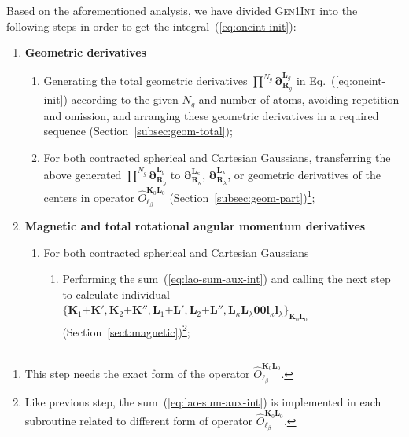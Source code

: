 \documentclass[a4paper,11pt,twoside,openright]{book}
\begin{document}
Based on the aforementioned analysis, we have divided \textsc{Gen1Int} into the following steps
in order to get the integral~(\ref{eq:oneint-init}):
\begin{enumerate}
  \item \textbf{Geometric derivatives}
  \begin{enumerate}
    \item Generating the total geometric derivatives
      $\prod^{N_{g}}\boldsymbol{\partial}_{\boldsymbol{R}_{g}}^{\boldsymbol{L}_{g}}$
      in Eq.~(\ref{eq:oneint-init}) according to the given $N_{g}$ and number of atoms, avoiding
      repetition and omission, and arranging these geometric derivatives in a required sequence (Section~\ref{subsec:geom-total});
    \item For both contracted spherical and Cartesian Gaussians, transferring the above generated
      $\prod^{N_{g}}\boldsymbol{\partial}_{\boldsymbol{R}_{g}}^{\boldsymbol{L}_{g}}$
      to $\boldsymbol{\partial}_{\boldsymbol{R}_{\kappa}}^{\boldsymbol{L}_{\kappa}}$,
      $\boldsymbol{\partial}_{\boldsymbol{R}_{\lambda}}^{\boldsymbol{L}_{\lambda}}$,
      or geometric derivatives of the centers in operator $\hat{O}_{\ell_{\beta}}^{\boldsymbol{K}_{0}\boldsymbol{L}_{0}}$
      (Section~\ref{subsec:geom-part})\footnote{This step needs the exact form of the operator
      $\hat{O}_{\ell_{\beta}}^{\boldsymbol{K}_{0}\boldsymbol{L}_{0}}$.};
  \end{enumerate}
  \item \textbf{Magnetic and total rotational angular momentum derivatives}
  \begin{enumerate}
    \item For both contracted spherical and Cartesian Gaussians
    \begin{enumerate}
      \item Performing the sum~(\ref{eq:lao-sum-aux-int}) and calling the next step to calculate individual\linebreak
        $\{\boldsymbol{K}_{1}\mathrm{+}\boldsymbol{K}',\boldsymbol{K}_{2}\mathrm{+}\boldsymbol{K}'',%
          \boldsymbol{L}_{1}\mathrm{+}\boldsymbol{L}',\boldsymbol{L}_{2}\mathrm{+}\boldsymbol{L}'',%
          \boldsymbol{L}_{\kappa}\boldsymbol{L}_{\lambda}\boldsymbol{00}%
          \boldsymbol{l}_{\kappa}\boldsymbol{l}_{\lambda}\}_{\boldsymbol{K}_{0}\boldsymbol{L}_{0}}$
          (Section~\ref{sect:magnetic})\footnote{Like previous step, the sum~(\ref{eq:lao-sum-aux-int}) is implemented
          in each subroutine related to different form of operator $\hat{O}_{\ell_{\beta}}^{\boldsymbol{K}_{0}\boldsymbol{L}_{0}}$.};

\end{enumerate}
\end{enumerate}
\end{enumerate}
\end{document}
